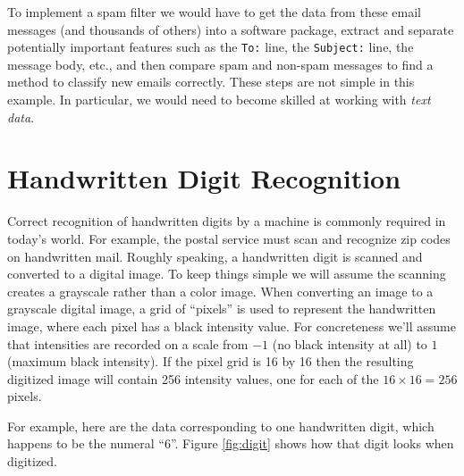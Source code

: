 \documentclass[
]{krantz}
\begin{document}
To implement a spam filter we would have to get the data from these email messages (and thousands of others) into a software package, extract and separate potentially important features such as the \texttt{To:} line, the \texttt{Subject:} line, the message body, etc., and then compare spam and non-spam messages to find a method to classify new emails correctly. These steps are not simple in this example. In particular, we would need to become skilled at working with \emph{text data}.

\hypertarget{handwritten-digit-recognition}{%
\section{Handwritten Digit Recognition}\label{handwritten-digit-recognition}}

Correct recognition of handwritten digits by a machine is commonly required in today's world. For example, the postal service must scan and recognize zip codes on handwritten mail. Roughly speaking, a handwritten digit is scanned and converted to a digital image. To keep things simple we will assume the scanning creates a grayscale rather than a color image. When converting an image to a grayscale digital image, a grid of ``pixels'' is used to represent the handwritten image, where each pixel has a black intensity value. For concreteness we'll assume that intensities are recorded on a scale from \(-1\) (no black intensity at all) to \(1\) (maximum black intensity). If the pixel grid is 16 by 16 then the resulting digitized image will contain 256 intensity values, one for each of the \(16\times 16 = 256\) pixels.

For example, here are the data corresponding to one handwritten digit, which happens to be the numeral ``6''. Figure \ref{fig:digit} shows how that digit looks when digitized.
\end{document}
